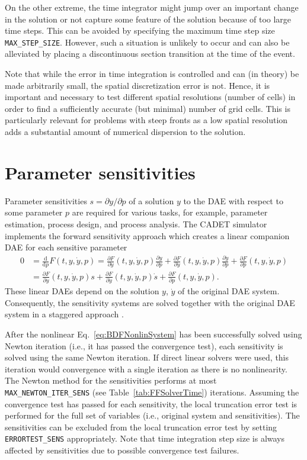 On the other extreme, the time integrator might jump over an important change in the solution or not capture some feature of the solution because of too large time steps.
This can be avoided by specifying the maximum time step size \texttt{MAX\_STEP\_SIZE}.
However, such a situation is unlikely to occur and can also be alleviated by placing a discontinuous section transition at the time of the event.

Note that while the error in time integration is controlled and can (in theory) be made arbitrarily small, the spatial discretization error is not.
Hence, it is important and necessary to test different spatial resolutions (number of cells) in order to find a sufficiently accurate (but minimal) number of grid cells.
This is particularly relevant for problems with steep fronts as a low spatial resolution adds a substantial amount of numerical dispersion to the solution.

\section{Parameter sensitivities}\label{sec:SimParamSens}

Parameter sensitivities $s = \partial y / \partial p$  of a solution $y$ to the DAE with respect to some parameter $p$ are required for various tasks, for example, parameter estimation, process design, and process analysis.
The CADET simulator implements the forward sensitivity approach which creates a linear companion DAE for each sensitive parameter
\begin{align*}
	0 &= \frac{\mathrm{d}}{\mathrm{d}p} F(t, y, \dot{y}, p) = \frac{\partial F}{\partial y}(t, y, \dot{y}, p) \frac{\partial y}{\partial p} + \frac{\partial F}{\partial \dot{y}}(t, y, \dot{y}, p) \frac{\partial \dot{y}}{\partial p} + \frac{\partial F}{\partial p}(t, y, \dot{y}, p) \\
	&= \frac{\partial F}{\partial y}(t, y, \dot{y}, p) s + \frac{\partial F}{\partial \dot{y}}(t, y, \dot{y}, p) \dot{s} + \frac{\partial F}{\partial p}(t, y, \dot{y}, p).
\end{align*}
These linear DAEs depend on the solution $y$, $\dot{y}$ of the original DAE system.
Consequently, the sensitivity systems are solved together with the original DAE system in a staggered approach \cite{Feehery1997}.

After the nonlinear Eq.~\eqref{eq:BDFNonlinSystem} has been successfully solved using Newton iteration (i.e., it has passed the convergence test), each sensitivity is solved using the same Newton iteration.
If direct linear solvers were used, this iteration would convergence with a single iteration as there is no nonlinearity.
The Newton method for the sensitivities performs at most \texttt{MAX\_NEWTON\_ITER\_SENS} (see Table~\ref{tab:FFSolverTime}) iterations.
Assuming the convergence test has passed for each sensitivity, the local truncation error test is performed for the full set of variables (i.e., original system and sensitivities).
The sensitivities can be excluded from the local truncation error test by setting \texttt{ERRORTEST\_SENS} appropriately.
Note that time integration step size is always affected by sensitivities due to possible convergence test failures.

